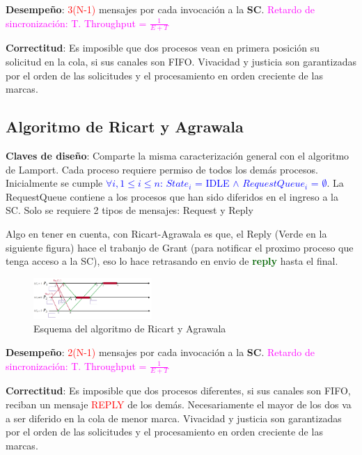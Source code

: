\textbf{Desempeño}: \textcolor{red}{3(N-1)} mensajes por cada invocación a la \textbf{SC}. \textcolor{magenta}{Retardo de sincronización: T. Throughput = $\frac{1}{E+T}$}

\textbf{Correctitud}: Es imposible que dos procesos vean en primera posición su solicitud en la cola, si sus canales son FIFO. Vivacidad y justicia son garantizadas por el orden de las solicitudes y el procesamiento en orden creciente de las marcas.

\subsection{Algoritmo de Ricart y Agrawala}

\textbf{Claves de diseño}: Comparte la misma caracterización general con el algoritmo de Lamport. Cada proceso requiere permiso de todos los demás procesos. Inicialmente se cumple \textcolor{blue}{$\forall i, 1 \leq i \leq n$: $State_i$ = IDLE $\wedge$ $RequestQueue_i$ = $\emptyset$}. La RequestQueue contiene a los procesos que han sido diferidos en el ingreso a la SC. Solo se requiere 2 tipos de mensajes: Request y Reply

Algo en tener en cuenta, con Ricart-Agrawala es que, el Reply (Verde en la siguiente figura) hace el trabanjo de Grant (para notificar el proximo proceso que tenga acceso a la SC), eso lo hace retrasando en envio de \textcolor{darkgreen}{\textbf{reply}} hasta el final.
\begin{figure}[H]
    \centering
    \includegraphics[width=0.4\textwidth]{img/A_Ricart_Agrawala.png}
    \caption{Esquema del algoritmo de Ricart y Agrawala}
\end{figure}

\textbf{Desempeño}: \textcolor{red}{2(N-1)} mensajes por cada invocación a la \textbf{SC}.  \textcolor{magenta}{Retardo de sincronización: T. Throughput = $\frac{1}{E+T}$}

\textbf{Correctitud}: Es imposible que dos procesos diferentes, si sus canales son FIFO, reciban un mensaje \textcolor{red}{REPLY} de los demás. Necesariamente el mayor de los dos va a ser diferido en la cola de menor marca. Vivacidad y justicia son garantizadas por el orden de las solicitudes y el procesamiento en orden creciente de las marcas.

